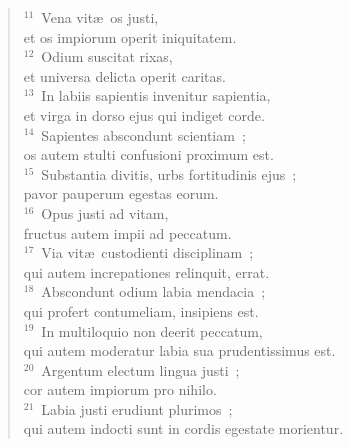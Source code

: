 \begin{flushleft}\begin{verse}${}^{11}$~Vena vit\ae\ os justi,\\ et os impiorum operit iniquitatem.\\
${}^{12}$~Odium suscitat rixas,\\ et universa delicta operit caritas.\\
${}^{13}$~In labiis sapientis invenitur sapientia,\\ et virga in dorso ejus qui indiget corde.\\
${}^{14}$~Sapientes abscondunt scientiam~;\\ os autem stulti confusioni proximum est.\\
${}^{15}$~Substantia divitis, urbs fortitudinis ejus~;\\ pavor pauperum egestas eorum.\\
${}^{16}$~Opus justi ad vitam,\\ fructus autem impii ad peccatum.\\
${}^{17}$~Via vit\ae\ custodienti disciplinam~;\\ qui autem increpationes relinquit, errat.\\
${}^{18}$~Abscondunt odium labia mendacia~;\\ qui profert contumeliam, insipiens est.\\
${}^{19}$~In multiloquio non deerit peccatum,\\ qui autem moderatur labia sua prudentissimus est.\\
${}^{20}$~Argentum electum lingua justi~;\\ cor autem impiorum pro nihilo.\\
${}^{21}$~Labia justi erudiunt plurimos~;\\ qui autem indocti sunt in cordis egestate morientur.\end{verse}\end{flushleft}


